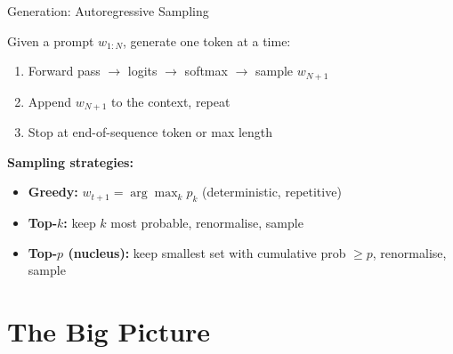 \documentclass[aspectratio=169, professionalfonts]{beamer}
\begin{document}
\begin{frame}{Generation: Autoregressive Sampling}

Given a prompt $w_{1:N}$, generate one token at a time:

\begin{enumerate}
  \item Forward pass $\to$ logits $\to$ softmax $\to$ sample $w_{N+1}$
  \item Append $w_{N+1}$ to the context, repeat
  \item Stop at end-of-sequence token or max length
\end{enumerate}

\bigskip

\textbf{Sampling strategies:}

\begin{itemize}
  \item \textbf{Greedy:} $w_{t+1} = \arg\max_k p_k$
        (deterministic, repetitive)
  \item \textbf{Top-$k$:} keep $k$ most probable, renormalise, sample
  \item \textbf{Top-$p$ (nucleus):} keep smallest set with
        cumulative prob $\ge p$, renormalise, sample
\end{itemize}

\end{frame}

\section{The Big Picture}
\end{document}
